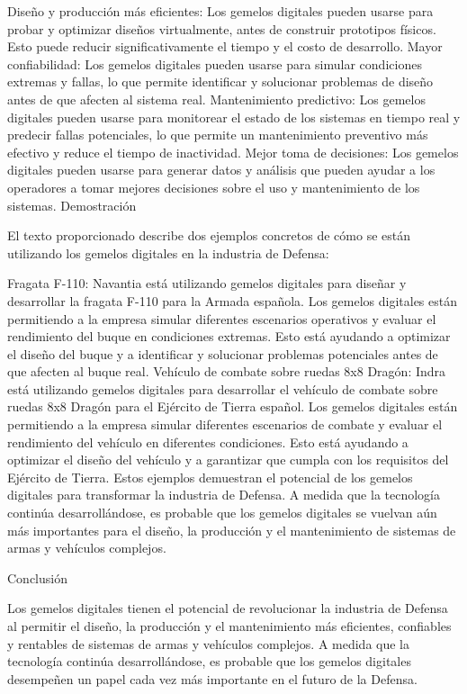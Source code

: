 \documentclass{article}
\begin{document}
Diseño y producción más eficientes: Los gemelos digitales pueden usarse
para probar y optimizar diseños virtualmente, antes de construir
prototipos físicos. Esto puede reducir significativamente el tiempo y el
costo de desarrollo. Mayor confiabilidad: Los gemelos digitales pueden
usarse para simular condiciones extremas y fallas, lo que permite
identificar y solucionar problemas de diseño antes de que afecten al
sistema real. Mantenimiento predictivo: Los gemelos digitales pueden
usarse para monitorear el estado de los sistemas en tiempo real y
predecir fallas potenciales, lo que permite un mantenimiento preventivo
más efectivo y reduce el tiempo de inactividad. Mejor toma de
decisiones: Los gemelos digitales pueden usarse para generar datos y
análisis que pueden ayudar a los operadores a tomar mejores decisiones
sobre el uso y mantenimiento de los sistemas. Demostración

El texto proporcionado describe dos ejemplos concretos de cómo se están
utilizando los gemelos digitales en la industria de Defensa:

Fragata F-110: Navantia está utilizando gemelos digitales para diseñar y
desarrollar la fragata F-110 para la Armada española. Los gemelos
digitales están permitiendo a la empresa simular diferentes escenarios
operativos y evaluar el rendimiento del buque en condiciones extremas.
Esto está ayudando a optimizar el diseño del buque y a identificar y
solucionar problemas potenciales antes de que afecten al buque real.
Vehículo de combate sobre ruedas 8x8 Dragón: Indra está utilizando
gemelos digitales para desarrollar el vehículo de combate sobre ruedas
8x8 Dragón para el Ejército de Tierra español. Los gemelos digitales
están permitiendo a la empresa simular diferentes escenarios de combate
y evaluar el rendimiento del vehículo en diferentes condiciones. Esto
está ayudando a optimizar el diseño del vehículo y a garantizar que
cumpla con los requisitos del Ejército de Tierra. Estos ejemplos
demuestran el potencial de los gemelos digitales para transformar la
industria de Defensa. A medida que la tecnología continúa
desarrollándose, es probable que los gemelos digitales se vuelvan aún
más importantes para el diseño, la producción y el mantenimiento de
sistemas de armas y vehículos complejos.

Conclusión

Los gemelos digitales tienen el potencial de revolucionar la industria
de Defensa al permitir el diseño, la producción y el mantenimiento más
eficientes, confiables y rentables de sistemas de armas y vehículos
complejos. A medida que la tecnología continúa desarrollándose, es
probable que los gemelos digitales desempeñen un papel cada vez más
importante en el futuro de la Defensa.



\end{document}
